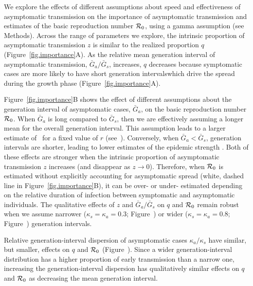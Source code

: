 We explore the effects of different assumptions about speed and effectiveness of asymptomatic transmission on the importance of asymptomatic transmission and estimates of the basic reproduction number ${\cal{R}}_0$, using a gamma assumption (see Methods).
Across the range of parameters we explore, the intrinsic proportion of asymptomatic transmission $z$ is similar to the realized proportion $q$ (Figure~\ref{fig.importance}A).
As the relative mean generation interval of asymptomatic transmission, $\bar G_a/\bar G_s$, increases, $q$ decreases because symptomatic cases are more likely to have short generation intervals\DIFdelbegin {}\DIFdelend \DIFaddbegin \DIFadd{, }\DIFaddend which drive the spread during the growth phase (Figure~\ref{fig.importance}A).
\DIFaddbegin {}\DIFaddend 

Figure~\ref{fig.importance}B shows the effect of different assumptions about the generation interval of asymptomatic cases, $\bar G_a$, on the \DIFaddbegin {}\DIFaddend basic reproduction number ${\cal{R}}_0$.
When $\bar G_a$ is long compared to $\bar G_s$, then we are effectively assuming a longer mean for the overall generation interval. 
This assumption leads to a larger estimate of \Ro\ for a fixed value of $r$ (see~\citep{park_2019practical}).
Conversely, when $\bar G_a < \bar G_s$, generation intervals are shorter, leading to lower estimates of the epidemic strength \Ro. Both of these effects are stronger when the intrinsic proportion of asymptomatic transmission $z$ increases (and disappear as $z\to0$).
Therefore, when ${\cal{R}}_0$ is estimated without explicitly accounting for asymptomatic spread (white, dashed line in Figure~\ref{fig.importance}B), it can be over- or under- estimated depending on the relative duration of infection between symptomatic and asymptomatic individuals.
The qualitative effects of $z$ and $\bar G_a/\bar G_s$ on $q$ and ${\cal{R}}_0$ remain robust when we assume narrower ($\kappa_s = \kappa_a = 0.3$; Figure~\DIFdelbegin {}\DIFdelend \DIFaddbegin {}\DIFaddend ) or wider ($\kappa_s = \kappa_a = 0.8$; Figure~\DIFdelbegin {}\DIFdelend \DIFaddbegin {}\DIFaddend ) generation intervals.

Relative generation-interval dispersion of asymptomatic cases $\kappa_a/\kappa_s$ have similar, but smaller, effects on $q$ and ${\cal{R}}_0$ (Figure~\DIFdelbegin {}\DIFdelend \DIFaddbegin {}\DIFaddend ).
Since a wider generation-interval distribution has a higher proportion of early transmission than a narrow one, increasing the generation-interval dispersion has qualitatively similar effects on $q$ and ${\cal{R}}_0$ as decreasing the mean generation interval.

